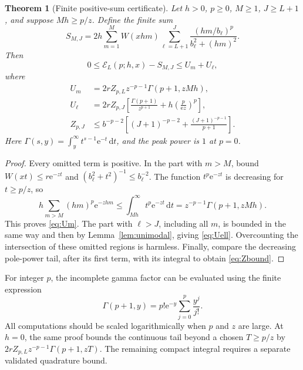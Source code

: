 \documentclass[11pt,a4paper]{article}
\numberwithin{equation}{section}
\newtheorem{theorem}{Theorem}[section]
\theoremstyle{definition}\newtheorem{definition}[theorem]{Definition}
\theoremstyle{remark}\newtheorem{remark}[theorem]{Remark}
\newcommand{\e}{\mathrm e}
\newcommand{\dd}{\,\mathrm d}
\newcommand{\calE}{\mathcal E}
\begin{document}
\begin{theorem}[Finite positive-sum certificate]
\label{thm:finite}
Let $h>0$, $p\ge0$, $M\ge1$, $J\ge L+1$, and suppose $Mh\ge p/z$.
Define the finite sum
\begin{equation}
 S_{M,J}=2h\sum_{m=1}^M W(xhm)
        \sum_{\ell=L+1}^{J}
        \frac{(hm/b_\ell)^p}{b_\ell^2+(hm)^2}.
 \label{eq:Sfinite}
\end{equation}
Then
\begin{equation}
 0\le\calE_L(p;h,x)-S_{M,J}\le U_m+U_\ell,
 \label{eq:finite-bound}
\end{equation}
where
\begin{align}
 U_m&=2rZ_{p,L}z^{-p-1}\Gamma(p+1,zMh),\label{eq:Um}\\
 U_\ell&=2rZ_{p,J}
 \left[\frac{\Gamma(p+1)}{z^{p+1}}
           +h\left(\frac p{\e z}\right)^p\right],\label{eq:Uell}\\
 Z_{p,J}&\le b^{-p-2}
 \left[(J+1)^{-p-2}+\frac{(J+1)^{-p-1}}{p+1}\right].
 \label{eq:Zbound}
\end{align}
Here $\Gamma(s,y)=\int_y^\infty t^{s-1}\e^{-t}\dd t$, and the peak
power is $1$ at $p=0$.
\end{theorem}
\begin{proof}
Every omitted term is positive. In the part with $m>M$, bound
$W(xt)\le r\e^{-zt}$ and $(b_\ell^2+t^2)^{-1}\le b_\ell^{-2}$.
The function $t^p\e^{-zt}$ is decreasing for $t\ge p/z$, so
\[
 h\sum_{m>M}(hm)^p\e^{-zhm}
 \le\int_{Mh}^\infty t^p\e^{-zt}\dd t
 =z^{-p-1}\Gamma(p+1,zMh).
\]
This proves \eqref{eq:Um}. The part with $\ell>J$, including all $m$, is
bounded in the same way and then by Lemma~\ref{lem:unimodal}, giving
\eqref{eq:Uell}. Overcounting the intersection of these omitted regions
is harmless. Finally, compare the decreasing pole-power tail, after its
first term, with its integral to obtain \eqref{eq:Zbound}.
\end{proof}

For integer $p$, the incomplete gamma factor can be evaluated using the
finite expression
\begin{equation}
 \Gamma(p+1,y)=p!\e^{-y}\sum_{j=0}^p\frac{y^j}{j!}.
 \label{eq:incomplete-finite}
\end{equation}
All computations should be scaled logarithmically when $p$ and $z$ are
large. At $h=0$, the same proof bounds the continuous tail beyond a chosen
$T\ge p/z$ by $2rZ_{p,L}z^{-p-1}\Gamma(p+1,zT)$. The remaining compact
integral requires a separate validated quadrature bound.
\end{document}
